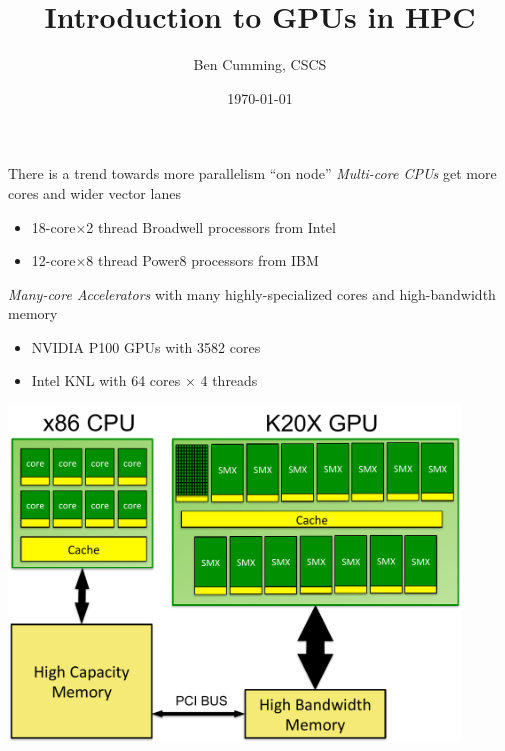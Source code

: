\documentclass[aspectratio=43]{beamer}
\author{Ben Cumming, CSCS}
\title{Introduction to GPUs in HPC}
\subtitle{}
\date{\today}
\begin{document}
\cscstitle


\begin{frame}[fragile]{}
    \begin{info}{There is a trend towards more parallelism ``on node''}
        \emph{Multi-core CPUs} get more cores and wider vector lanes
        \begin{itemize}
            \item 18-core$\times$2 thread Broadwell processors from Intel
            \item 12-core$\times$8 thread Power8 processors from IBM
        \end{itemize}
        \emph{Many-core Accelerators} with many highly-specialized cores and high-bandwidth memory
        \begin{itemize}
            \item NVIDIA P100 GPUs with 3582 cores
            \item Intel KNL with 64 cores $\times$ 4 threads
        \end{itemize}
    \end{info}

\end{frame}

\begin{frame}[fragile]{}
    \begin{center}
        \includegraphics[width=0.9\textwidth]{./images/node.pdf}
    \end{center}
\end{frame}
\end{document}
